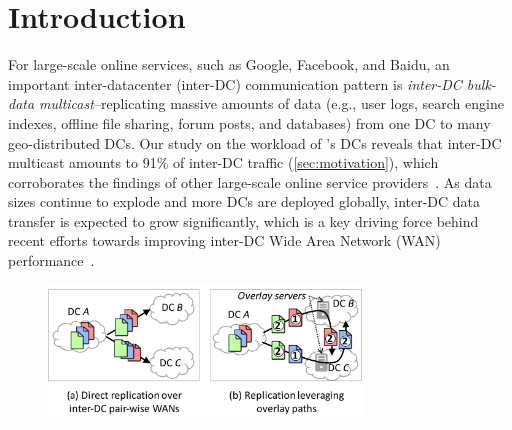 \section{Introduction}

For large-scale online services, such as Google, Facebook, and
Baidu, an important inter-datacenter (inter-DC) communication pattern is
{\em inter-DC bulk-data multicast}--replicating massive amounts of data
(e.g., user logs, search engine indexes, offline file sharing,
forum posts, and databases)
from one DC to many geo-distributed DCs.
Our study on the workload of
\company{}'s DCs reveals that
inter-DC multicast amounts to 91\% of inter-DC traffic
(\Section\ref{sec:motivation}), which corroborates the findings of
other large-scale online service providers~\cite{kumar2015bwe,zhang2016piebridge}.
As data sizes continue to explode and more DCs are deployed
globally, inter-DC data transfer is expected
to grow significantly, which is a key driving force behind
recent efforts towards improving inter-DC Wide Area Network (WAN)
performance~\cite{savage1999Theend,jain2013b4,kumar2015bwe,hong2013achieving,zhang2015guarantee}.




\begin{figure}[t!]
\includegraphics[width=83mm]{images/intro-example.pdf}
\vspace{-0.4cm}
\label{fig:intro}
\vspace{-0.4cm}
\end{figure}

